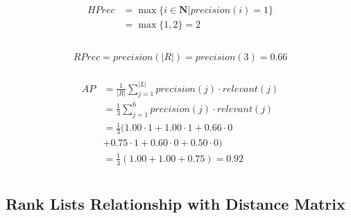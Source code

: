 \begin{example}[!t]
  \vspace{0.5cm}

  \begin{subexample}{\linewidth}
    \begin{gather*}
      \begin{split}
        HPrec &= \max\{i \in \mathbf{N} | precision(i) = 1\} \\
              &= \max\{1, 2\} = 2 \\
      \end{split}
    \end{gather*}
  \end{subexample}

  \vspace{0.5cm}

  \begin{subexample}{\linewidth}
    \begin{gather*}
      \begin{split}
        RPrec = precision(|R|) = precision(3) = 0.66
      \end{split}
    \end{gather*}
  \end{subexample}

  \vspace{0.5cm}

  \begin{subexample}{\linewidth}
    \begin{gather*}
      \begin{split}
        AP &= \frac{1}{|R|} \sum_{j=1}^{|L|} precision(j) \cdot relevant(j) \\
           &= \frac{1}{3} \sum_{j=1}^{6} precision(j) \cdot relevant(j) \\
           &= \frac{1}{3} ( 1.00 \cdot 1 + 1.00 \cdot 1 + 0.66 \cdot 0 \\
           &+ 0.75 \cdot 1 + 0.60 \cdot 0 + 0.50 \cdot 0) \\
           &= \frac{1}{3} (1.00 + 1.00 + 0.75) = 0.92 \\
      \end{split}
    \end{gather*}
  \end{subexample}

\end{example}

\subsection{Rank Lists Relationship with Distance Matrix \label{sec:distances_matrix}}


